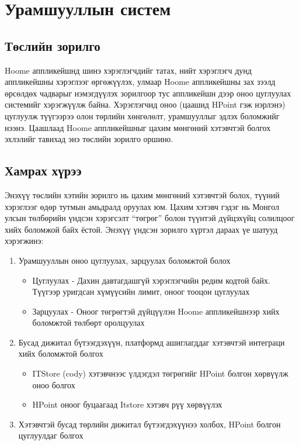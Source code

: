 \chapter{Урамшууллын систем}
\section{Төслийн зорилго}
Hoome аппликейшнд шинэ хэрэглэгчдийг татах, нийт хэрэглэгч дунд аппликейшны
хэрэглээг өргөжүүлэх, улмаар Hoome аппликейшны зах зээлд өрсөлдөх чадварыг
нэмэгдүүлэх зорилгоор тус аппликейшн дээр оноо цуглуулах системийг хэрэгжүүлж
байна. Хэрэглэгчид оноо (цаашид HPoint гэж нэрлэнэ) цуглуулж түүгээрээ олон төрлийн
хөнгөлөлт, урамшууллыг эдлэх боломжийг нээнэ. Цаашлаад Hoome аппликейшныг
цахим мөнгөний хэтэвчтэй болгох эхлэлийг тавихад энэ төслийн зорилго оршино.

\section{Хамрах хүрээ}
Энэхүү төслийн хэтийн зорилго нь цахим мөнгөний хэтэвчтэй болох, түүний хэрэглээг
өдөр тутмын амьдралд оруулах юм. Цахим хэтэвч гэдэг нь Монгол улсын төлбөрийн
үндсэн хэрэгсэлт “төгрөг” болон түүнтэй дүйцэхүйц солилцоог хийх боломжой байх
ёстой.
Энэхүү үндсэн зорилго хүртэл дараах үе шатууд хэрэгжинэ:

\begin{enumerate}
  \item Урамшууллын оноо цуглуулах, зарцуулах боломжтой болох
  \begin{itemize}
    \item Цуглуулах - Дахин давтагдашгүй хэрэглэгчийн редим кодтой байх.
    Түүгээр уригдсан хүмүүсийн лимит, оноог тооцон цуглуулах
    \item Зарцуулах - Оноог төгрөгтэй дүйцүүлэн Hoome аппликейшнээр хийх
    боломжтой төлбөрт оролцуулах
  \end{itemize}
  \item Бусад дижитал бүтээгдэхүүн, платформд ашиглагддаг хэтэвчтэй интеграци хийх
  боломжтой болгох
  \begin{itemize}
    \item ITStore (cody) хэтэвчнээс үлдэгдэл төгрөгийг HPoint болгон хөрвүүлж
    оноо болгох
    \item HPoint оноог буцаагаад Itstore хэтэвч рүү хөрвүүлэх
  \end{itemize}
  \item Хэтэвчтэй бусад төрлийн дижитал бүтээгдэхүүнээ холбох, HPoint болгон
  цуглуулдаг болгох
\end{enumerate}

